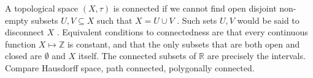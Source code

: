 A topological space  $ (X, \tau ) $  is connected if
we cannot find open disjoint non-empty subsets  $ U,V \subseteq  X $  such that
 $ X=U \cup V $ . Such sets  $ U,V $  would be said to  disconnect  $ X $ .
Equivalent conditions to connectedness are that every
continuous
function  $ X \mapsto \mathbb{Z} $  is constant, and that the only subsets that are both open and closed
are  $  \emptyset $  and  $ X $  itself. The connected subsets of  $  \mathbb{R} $  are
precisely the intervals.
Compare Hausdorff space, path connected, polygonally connected.


